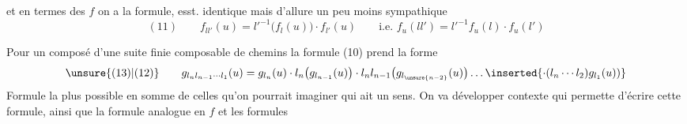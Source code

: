 et en termes des $f$ on a la formule, esst. identique mais d'allure un peu moins sympathique
\[
(11)\qquad f_{ll'}(u)=l'^{-1}\bigl(f_l(u)\bigr)\cdot f_{l'}(u)
\qquad\text{i.e. }f_u(ll')=l'^{-1}f_u(l)\cdot f_u(l')
\]


Pour un composé d'une  suite finie composable de chemins
la formule (10) prend la forme
\[
\unsure{(13)|(12)}\qquad
 g_{l_nl_{n-1}\cdots l_1}(u)=g_{l_n}(u)\cdot l_n\bigl(g_{l_{n-1}}(u)\bigr)\cdot l_nl_{n-1}\bigl(g_{l_{\unsure{n-2}}}(u)\bigr)\ldots
 \inserted{\cdot(l_n\cdots l_2)g_{l_1}(u))}
\]
Formule la plus   possible en somme de celles qu'on pourrait imaginer qui ait un sens. On va développer   contexte qui permette  d'écrire cette formule, ainsi que  la formule analogue en $f$ et les formules
